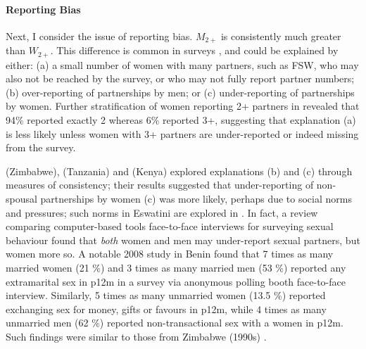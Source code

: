 \paragraph{Reporting Bias}
Next, I consider the issue of reporting bias.
$M_{2+}$ is consistently much greater than $W_{2+}$.
This difference is common in surveys \cite{Todd2009,Higgins2010}, and could be explained by either:
(a) a small number of women with many partners,
such as FSW, who may also not be reached by the survey,
or who may not fully report partner numbers;
(b) over-reporting of partnerships by men; or
(c) under-reporting of partnerships by women.
Further stratification of women reporting 2+ partners in \cite[Table~14.7.1]{SDHS2006}
revealed that 94\% reported exactly 2 whereas 6\% reported 3+,
suggesting that explanation (a) is less likely unless
women with 3+ partners are under-reported or indeed missing from the survey.
\par
\citet{Gregson2002} (Zimbabwe), \citet{Nnko2004} (Tanzania) and \citet{Clark2011} (Kenya)
explored explanations (b) and (c) through measures of consistency; their results suggested that
under-reporting of non-spousal partnerships by women (c) was more likely,
perhaps due to social norms and pressures;
such norms in Eswatini are explored in \cite{Ruark2014,Fielding-Miller2016,Ruark2019,Pulerwitz2021}.
In fact, a review comparing computer-based tools \vs face-to-face interviews
for surveying sexual behaviour \cite{Langhaug2010} found that
\emph{both} women and men may under-report sexual partners, but women more so.
A notable 2008 study in Benin \cite{Behanzin2013} found that
7 times as many married women (21 \%) and 3 times as many married men (53 \%)
reported any extramarital sex in p12m
in a survey via anonymous polling booth \vs face-to-face interview.
Similarly, 5 times as many unmarried women (13.5 \%) reported
exchanging sex for money, gifts or favours in p12m, while
4 times as many unmarried men (62 \%) reported non-transactional sex with a women in p12m.
Such findings were similar to those from Zimbabwe (1990s) \cite{Gregson2002}.
